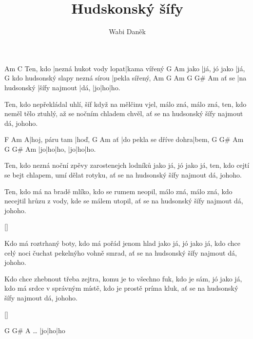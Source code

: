 \documentclass{song}
\title{Hudskonský šífy}
\author{Wabi Daněk}
\begin{document}
\strophe
         Am                     C
Ten, kdo |nezná hukot vody lopat|kama vířený
     G            Am
jako |já, jó jako |já,
                                G
kdo hudsonský slapy nezná sírou |pekla sířený,
	  Am            G             Am   G  G# Am
ať se |na hudsonský |šífy najmout |dá, |jo|ho|ho.
\endstrophe

\strophe*
Ten, kdo nepřekládal uhlí, šíf když na mělčinu vjel,
málo zná, málo zná,
ten, kdo neměl tělo ztuhlý, až se nočním chladem chvěl,
ať se na hudsonský šífy najmout dá, johoho.
\endstrophe

 F              Am
A|hoj, páru tam |hoď,
   G                       Am
ať |do pekla se dříve dohra|bem,
G  G# Am   G  G# Am
|jo|ho|ho, |jo|ho|ho.
\endstrophe

\strophe*
Ten, kdo nezná noční zpěvy zarostenejch lodníků
jako já, jó jako já,
ten, kdo cejtí se bejt chlapem, umí dělat rotyku,
ať se na hudsonský šífy najmout dá, johoho.
\endstrophe

\strophe*
Ten, kdo má na bradě mlíko, kdo se rumem neopil,
málo zná, málo zná,
kdo necejtil hrůzu z vody, kde se málem utopil,
ať se na hudsonský šífy najmout dá, johoho.
\endstrophe

\ref{}

\strophe*
Kdo má roztrhaný boty, kdo má pořád jenom hlad
jako já, jó jako já,
kdo chce celý noci čuchat pekelnýho vohně smrad,
ať se na hudsonský šífy najmout dá, johoho.
\endstrophe

\strophe*
Kdo chce zhebnout třeba zejtra, komu je to všechno fuk,
kdo je sám, jó jako já,
kdo má srdce v správným místě, kdo je prostě príma kluk,
ať se na hudsonský šífy najmout dá, johoho.
\endstrophe

\ref{}

\strophe
         G  G# A
\ldots{} |jo|ho|ho
\endstrophe
\end{document}
